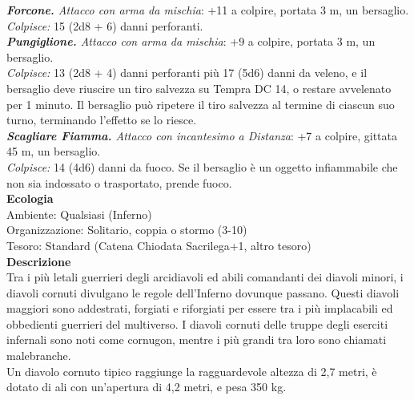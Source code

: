 \begin{multicols}{2}
\emph{\textbf{Forcone.} Attacco con arma da mischia}: +11 a colpire, portata 3 m, un bersaglio.\\
\emph{Colpisce:} 15 (2d8 + 6) danni perforanti.\\
\emph{\textbf{Pungiglione.} Attacco con arma da mischia}: +9 a colpire, portata 3 m, un bersaglio.\\
\emph{Colpisce:} 13 (2d8 + 4) danni perforanti più 17 (5d6) danni da veleno, e il bersaglio deve riuscire un tiro salvezza su Tempra DC 14, o restare avvelenato per 1 minuto. Il bersaglio può ripetere il tiro salvezza al termine di ciascun suo turno, terminando l'effetto se lo riesce.\\
\emph{\textbf{Scagliare Fiamma.} Attacco con incantesimo a Distanza}: +7 a colpire, gittata 45 m, un bersaglio.\\
\emph{Colpisce:} 14 (4d6) danni da fuoco. Se il bersaglio è un oggetto infiammabile che non sia indossato o trasportato, prende fuoco.\\
\textbf{Ecologia}\\
Ambiente: Qualsiasi (Inferno)\\
Organizzazione: Solitario, coppia o stormo (3-10)\\
Tesoro: Standard (Catena Chiodata Sacrilega+1, altro tesoro)\\
\textbf{Descrizione}\\
Tra i più letali guerrieri degli arcidiavoli ed abili comandanti dei diavoli minori, i diavoli cornuti divulgano le regole dell’Inferno dovunque passano. Questi diavoli maggiori sono addestrati, forgiati e riforgiati per essere tra i più implacabili ed obbedienti guerrieri del multiverso. I diavoli cornuti delle truppe degli eserciti infernali sono noti come cornugon, mentre i più grandi tra loro sono chiamati malebranche.\\
Un diavolo cornuto tipico raggiunge la ragguardevole altezza di 2,7 metri, è dotato di ali con un’apertura di 4,2 metri, e pesa 350 kg.\\


\end{multicols}
